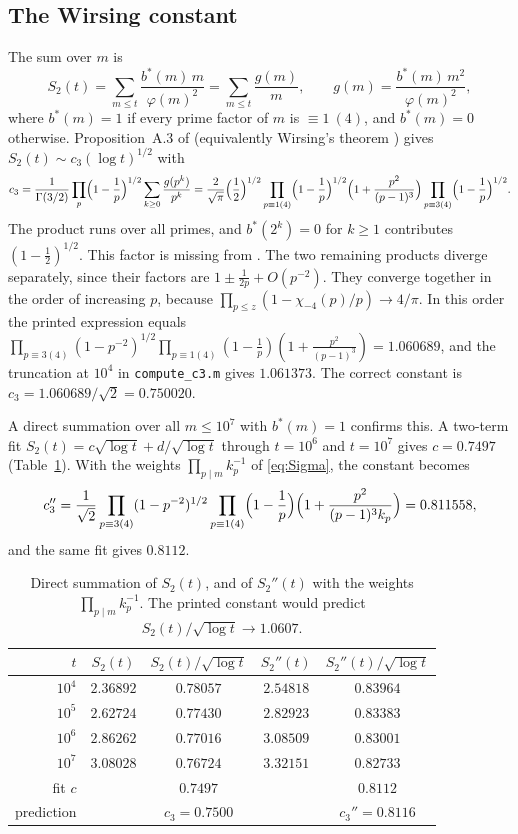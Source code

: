 \documentclass[11pt,a4paper]{amsart}
\theoremstyle{remark}
\numberwithin{equation}{section}
\begin{document}
\subsection{The Wirsing constant}
The sum over $m$ is
\[
S_2(t)=\sum_{m\le t}\frac{b^*(m)\,m}{\varphi(m)^2}=\sum_{m\le t}\frac{g(m)}m,\qquad g(m)=\frac{b^*(m)\,m^2}{\varphi(m)^2},
\]
where $b^*(m)=1$ if every prime factor of $m$ is $\equiv1\ (4)$, and $b^*(m)=0$ otherwise.
Proposition~A.3 of \cite{Martin} (equivalently Wirsing's theorem \cite{Wirsing}) gives
$S_2(t)\sim c_3(\log t)^{1/2}$ with
\begin{equation}\label{eq:c3}
c_3=\frac{1}{\Gamma(3/2)}\prod_{p}\Bigl(1-\frac1p\Bigr)^{1/2}\sum_{k\ge0}\frac{g(p^k)}{p^k}
=\frac{2}{\sqrt\pi}\Bigl(\frac12\Bigr)^{1/2}\prod_{p\equiv1(4)}\Bigl(1-\frac1p\Bigr)^{1/2}
\Bigl(1+\frac{p^2}{(p-1)^3}\Bigr)\prod_{p\equiv3(4)}\Bigl(1-\frac1p\Bigr)^{1/2}.
\end{equation}
The product runs over all primes, and $b^*(2^k)=0$ for $k\ge1$ contributes $(1-\frac12)^{1/2}$. This factor is
missing from \cite[(4.20)]{NX}. The two remaining products diverge separately, since their factors are
$1\pm\frac1{2p}+O(p^{-2})$. They converge together in the order of increasing $p$, because
$\prod_{p\le z}(1-\chi_{-4}(p)/p)\to4/\pi$. In this order the printed expression equals
$\prod_{p\equiv3(4)}(1-p^{-2})^{1/2}\prod_{p\equiv1(4)}(1-\frac1p)(1+\frac{p^2}{(p-1)^3})=1.060689$, and the
truncation at $10^4$ in \texttt{compute\_c3.m} gives $1.061373$. The correct constant is $c_3=1.060689/\sqrt2=0.750020$.

A direct summation over all $m\le10^7$ with $b^*(m)=1$ confirms this. A two-term fit $S_2(t)=c\sqrt{\log t}+d/\sqrt{\log t}$
through $t=10^6$ and $t=10^7$ gives $c=0.7497$ (Table~\ref{tab:c3}). With the weights $\prod_{p\mid m}k_p^{-1}$ of
\eqref{eq:Sigma}, the constant becomes
\[
c_3''=\frac{1}{\sqrt2}\prod_{p\equiv3(4)}(1-p^{-2})^{1/2}\prod_{p\equiv1(4)}\Bigl(1-\frac1p\Bigr)
\Bigl(1+\frac{p^2}{(p-1)^3k_p}\Bigr)=0.811558,
\]
and the same fit gives $0.8112$.

\begin{table}[htbp]
\centering\small
\begin{tabular}{rcccc}
\toprule
$t$ & $S_2(t)$ & $S_2(t)/\sqrt{\log t}$ & $S_2''(t)$ & $S_2''(t)/\sqrt{\log t}$\\
\midrule
$10^4$ & $2.36892$ & $0.78057$ & $2.54818$ & $0.83964$\\
$10^5$ & $2.62724$ & $0.77430$ & $2.82923$ & $0.83383$\\
$10^6$ & $2.86262$ & $0.77016$ & $3.08509$ & $0.83001$\\
$10^7$ & $3.08028$ & $0.76724$ & $3.32151$ & $0.82733$\\
\midrule
fit $c$ & & $0.7497$ & & $0.8112$\\
prediction & & $c_3=0.7500$ & & $c_3''=0.8116$\\
\bottomrule
\end{tabular}
\caption{Direct summation of $S_2(t)$, and of $S_2''(t)$ with the weights $\prod_{p\mid m}k_p^{-1}$. The printed
constant would predict $S_2(t)/\sqrt{\log t}\to1.0607$.}
\label{tab:c3}
\end{table}
\end{document}
